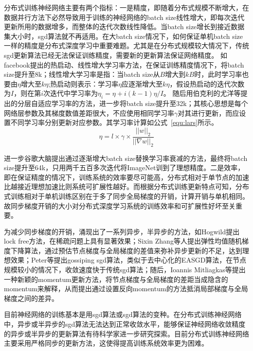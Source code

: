 分布式训练神经网络主要有两个指标：一是精度，即随着分布式规模不断增大，在数据并行方法下必然导致用于训练的神经网络的batch size线性增大，即每次迭代更新所用的数据增多，而整体的迭代次数线性降低。当batch size增长到接近数据集大小时，sgd算法就不再适用。在大batch size情况下，如何保证单机batch size一样的精度是分布式深度学习中重要难题。尤其是在分布式规模较大情况下，传统sgd更新算法已经无法保证训练精度，需要新的更新算法保证网络精度。
如facebook提出的热启动、线性增大学习率方法，在保证训练精度情况下，将batch size提升至8k；线性增大学习率是指：当batch size从$B$增大到$kB$时，此时学习率也要由$\eta$增大至$k\eta$;热启动则表示：学习率$\eta$应逐渐增大至$k\eta$，假设热启动的迭代次数为$I$，则在第$i$次迭代中学习率为$\eta _{i}=\eta + i(k-1)\eta/I$。
随后用伯克利的尤洋等提出的分层自适应学习率的方法，进一步将batch size提升至32k；其核心思想是每个网络层参数及其梯度数值差距很大，不应使用相同学习率$\gamma$对其进行更新，而应设置不同学习率分别更新对应参数。其学习率计算如公式~\ref{equ:lars}所示。
\begin{equation}
\eta = l \times \gamma \times \frac{||w||_{2}}{||\nabla w||_{2}}
\label{equ:lars}
\end{equation}

进一步谷歌大脑提出通过逐渐增大batch size替换学习率衰减的方法，最终将batch size提升至64k，只用两千五百多次迭代将ImageNet训到了理想精度。二是效率，即在保证精度的情况下，训练系统的效率要尽可能高，分布式相对于单节点的加速比越接近理想加速比则系统可扩展性越好。而根据分布式训练更新特点可知，分布式训练相对于单机训练区别在于多了同步全局梯度的开销，计算开销与单机相同。故同步梯度开销的大小对分布式深度学习系统的训练效率和可扩展性好坏至关重要。

为减少同步梯度的开销，涌现出了一系列异步，半异步的方法，如Hogwild提出lock free方法，在稀疏问题上具有显著效果；Sixin Zhang等人提出弹性均值随机梯度下降算法，通过预估节点梯度与全局梯度的差值来弥补异步更新的不足，达到理想效果；Peter等提出gossiping sgd算法，类似于去中心化的EASGD算法，在节点规模较小的情况下，收敛速度快于传统sgd算法；随后，Ioannis Mitliagkas等提出一种新颖的momentum更新方法，将节点梯度与全局梯度的差距当成隐含的momentum来解释，从而提出通过设置反向momentum的方法抵消局部梯度与全局梯度之间的差异。

目前神经网络的训练基本是用sgd算法或sgd算法的变种。在分布式训练神经网络中，异步或半异步的sgd算法无法达到正常收敛水平，能够保证神经网络收敛精度的异步或半异步的更新算法有待科学家进一步研究探索。目前分布式训练神经网络主要采用严格同步的更新方法，这使得提高训练系统效率更为困难。
